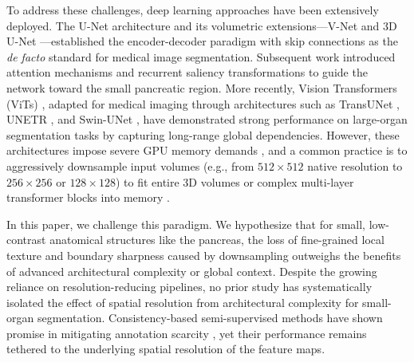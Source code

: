 \documentclass[review,authoryear]{elsarticle}
\begin{document}
To address these challenges, deep learning approaches have been extensively deployed. The U-Net architecture \cite{unet} and its volumetric extensions---V-Net \cite{vnet} and 3D U-Net \cite{cciccek20163d}---established the encoder-decoder paradigm with skip connections as the \textit{de facto} standard for medical image segmentation. Subsequent work introduced attention mechanisms \cite{attunet} and recurrent saliency transformations \cite{rstn} to guide the network toward the small pancreatic region. More recently, Vision Transformers (ViTs) \cite{dosovitskiy2020image}, adapted for medical imaging through architectures such as TransUNet \cite{transunet}, UNETR \cite{unetr_ref}, and Swin-UNet \cite{swinunet}, have demonstrated strong performance on large-organ segmentation tasks by capturing long-range global dependencies. However, these architectures impose severe GPU memory demands \cite{swin_teaching}, and a common practice is to aggressively downsample input volumes (e.g., from $512 \times 512$ native resolution to $256 \times 256$ or $128 \times 128$) to fit entire 3D volumes or complex multi-layer transformer blocks into memory \cite{bessl}.

In this paper, we challenge this paradigm. We hypothesize that for small, low-contrast anatomical structures like the pancreas, the loss of fine-grained local texture and boundary sharpness caused by downsampling outweighs the benefits of advanced architectural complexity or global context. Despite the growing reliance on resolution-reducing pipelines, no prior study has systematically isolated the effect of spatial resolution from architectural complexity for small-organ segmentation. Consistency-based semi-supervised methods have shown promise in mitigating annotation scarcity \cite{con_med_ssl}, yet their performance remains tethered to the underlying spatial resolution of the feature maps.
\end{document}
